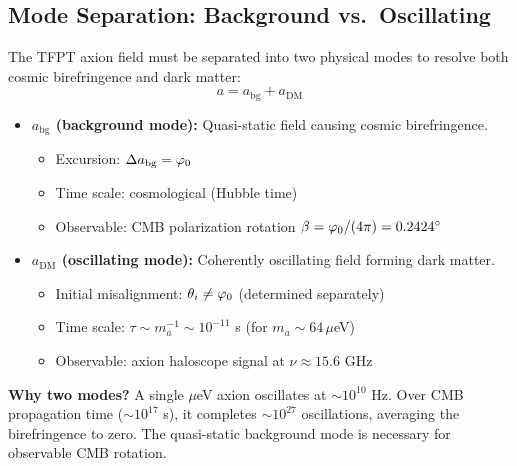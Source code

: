 \subsection{Mode Separation: Background vs.\ Oscillating}

The TFPT axion field must be separated into two physical modes to resolve both 
cosmic birefringence and dark matter:
\begin{equation}
    \boxed{a = a_{\text{bg}} + a_{\text{DM}}}
\end{equation}

\begin{tcolorbox}[colback=orange!5, colframe=orange!60!black, 
    title={\textbf{Two-Mode Axion Structure}}, fonttitle=\bfseries]
\begin{itemize}[leftmargin=1.5em, topsep=2pt, itemsep=2pt]
    \item \textbf{$a_{\text{bg}}$ (background mode):} Quasi-static field causing cosmic birefringence.
        \begin{itemize}[leftmargin=1em, topsep=1pt]
            \item Excursion: $\Delta a_{\text{bg}} = \varphi_0$
            \item Time scale: cosmological (Hubble time)
            \item Observable: CMB polarization rotation $\beta = \varphi_0/(4\pi) = 0.2424^\circ$
        \end{itemize}
    \item \textbf{$a_{\text{DM}}$ (oscillating mode):} Coherently oscillating field forming dark matter.
        \begin{itemize}[leftmargin=1em, topsep=1pt]
            \item Initial misalignment: $\theta_i \neq \varphi_0$ (determined separately)
            \item Time scale: $\tau \sim m_a^{-1} \sim 10^{-11}$ s (for $m_a \sim 64\,\mu$eV)
            \item Observable: axion haloscope signal at $\nu \approx 15.6$ GHz
        \end{itemize}
\end{itemize}

\textbf{Why two modes?} A single $\mu$eV axion oscillates at $\sim 10^{10}$ Hz. Over CMB 
propagation time ($\sim 10^{17}$ s), it completes $\sim 10^{27}$ oscillations, averaging 
the birefringence to zero. The quasi-static background mode is necessary for observable 
CMB rotation.
\end{tcolorbox}


